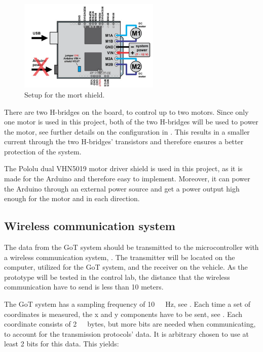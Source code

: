\begin{figure}[H]
	\centering
	\includegraphics[width=0.60\textwidth]{figures/MotordriverIO.png}
		\caption{Setup for the mort shield.\cite{DriverShield}}
	\label{MotorDriveIO}
\end{figure}

There are two H-bridges on the board, to control up to two motors. Since only one motor is used in this project, both of the two H-bridges will be used to power the motor, see further details on the configuration in . This results in a smaller current through the two H-bridges' transistors and therefore ensures a better protection of the system.\cite{PCorporation}

%
The Pololu dual VHN5019 motor driver shield is used in this project, as it is made for the Arduino and therefore easy to implement. Moreover, it can power the Arduino through an external power source and get a power output high enough for the motor and in each direction.\cite{STMicroelectronics}

\subsection{Wireless communication system}
The data from the GoT system should be transmitted to the microcontroller with a wireless communication system, . The transmitter will be located on the computer, utilized for the GoT system, and the receiver on the vehicle. As the prototype will be tested in the control lab, the distance that the wireless communication have to send is less than 10 meters.

The GoT system has a sampling frequency of \si{10\ Hz}, see . Each time a set of coordinates is measured, the x and y components have to be sent, see . Each coordinate consists of \si{2\ bytes}, but more bits are needed when communicating, to account for the transmission protocols' data. It is arbitrary chosen to use at least 2 bits for this data. This yields:

